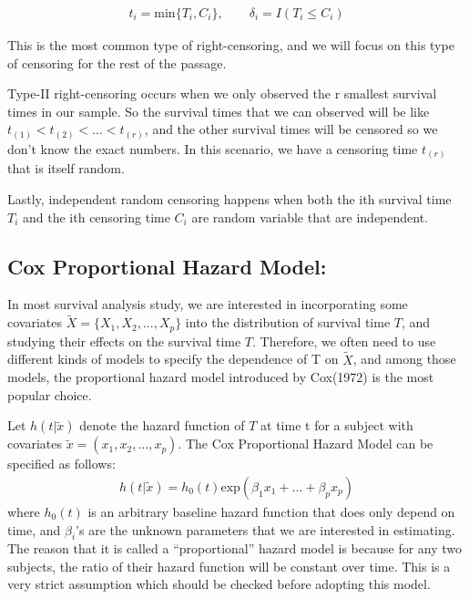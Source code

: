 \documentclass[]{article}
\begin{document}
\begin{equation}\begin{aligned}\label{eqn:transformed data}
t_i = \text{min}\{T_i,C_i \},  \qquad  \delta_i = I(T_i \leq C_i)
\end{aligned}\end{equation}

This is the most common type of right-censoring, and we will focus on
this type of censoring for the rest of the passage.

Type-II right-censoring occurs when we only observed the r smallest
survival times in our sample. So the survival times that we can observed
will be like \(t_{(1)}<t_{(2)}<...<t_{(r)}\), and the other survival
times will be censored so we don't know the exact numbers. In this
scenario, we have a censoring time \(t_{(r)}\) that is itself random.

Lastly, independent random censoring happens when both the ith survival
time \(T_i\) and the ith censoring time \(C_i\) are random variable that
are independent.

\hypertarget{cox-proportional-hazard-model}{%
\subsection{Cox Proportional Hazard
Model:}\label{cox-proportional-hazard-model}}

In most survival analysis study, we are interested in incorporating some
covariates \(\tilde{X} =\{X_1,X_2,...,X_p\}\) into the distribution of
survival time \(T\), and studying their effects on the survival time
\(T\). Therefore, we often need to use different kinds of models to
specify the dependence of T on \(\tilde{X}\), and among those models,
the proportional hazard model introduced by Cox(1972) is the most
popular choice.

Let \(h(t|\tilde{x})\) denote the hazard function of \(T\) at time t for
a subject with covariates \(\tilde{x} = (x_1,x_2,...,x_p)\). The Cox
Proportional Hazard Model can be specified as follows:
\begin{equation}\begin{aligned}\label{eqn:CoxHazardModel}
h(t|\tilde{x}) = h_0(t)\text{exp}(\beta_1x_1+...+\beta_px_p)
\end{aligned}\end{equation} where \(h_0(t)\) is an arbitrary baseline
hazard function that does only depend on time, and \(\beta_i\)'s are the
unknown parameters that we are interested in estimating. The reason that
it is called a ``proportional'' hazard model is because for any two
subjects, the ratio of their hazard function will be constant over time.
This is a very strict assumption which should be checked before adopting
this model.
\end{document}
